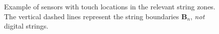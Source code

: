 \begin{figure}[h]
    
    \caption{Example of sensors with touch locations in the relevant string zones. The vertical dashed lines represent the string boundaries $\mathbf{B}_n$, \textit{not} digital strings. }
    \label{fig:trill_touches}
\end{figure}